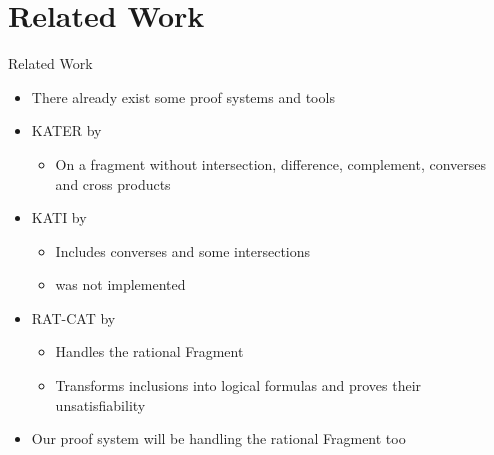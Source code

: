 \documentclass[t,english,aspectratio=169,11pt]{beamer}
\begin{document}
\section{Related Work}
\begin{frame}{Related Work}
\pause
\begin{itemize}[<+->]
	\item There already exist some proof systems and tools
	\item KATER by \cite{Kok+23}
	\begin{itemize}[<.->]
		\item On a fragment without intersection, difference, complement, converses and cross products
	\end{itemize}
	\item KATI by \cite{Kou+24}
	\begin{itemize}[<.->]
		\item Includes converses and some intersections 
		\item was not implemented
	\end{itemize}
	\item RAT-CAT by \cite{Gru+26}
	\begin{itemize}[<.->]
		\item Handles the rational Fragment
		\item Transforms inclusions into logical formulas and proves their unsatisfiability
	\end{itemize}
	\item Our proof system will be handling the rational Fragment too
\end{itemize}
\end{frame}
\end{document}

